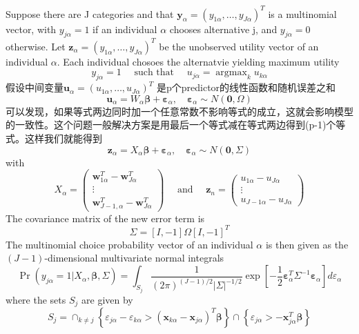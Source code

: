 \documentclass[
]{book}
\theoremstyle{definition}
\theoremstyle{definition}
\theoremstyle{definition}
\theoremstyle{remark}
\begin{document}
Suppose there are J categories and that \(\boldsymbol{y}_{\alpha}=\left(y_{1 \alpha}, \ldots, y_{J \alpha}\right)^{T}\) is a multinomial vector, with \(y_{j\alpha}=1\) if an individual \(\alpha\) chooses alternative j, and \(y_{j\alpha}=0\) otherwise. Let \(\boldsymbol{z}_{\alpha}=\left(y_{1 \alpha}, \ldots, y_{J \alpha}\right)^{T}\) be the unobserved utility vector of an individual \(\alpha\). Each individual chosoes the alternatvie yielding maximum utility
\[
y_{j \alpha}=1 \quad \text { such that } \quad u_{j \alpha}=\operatorname{argmax}_{k} u_{k \alpha}
\]
假设中间变量\(\boldsymbol{u}_{\alpha}=\left(u_{1 \alpha}, \dots, u_{J \alpha}\right)^{T}\) 是p个predictor的线性函数和随机误差之和
\[
\boldsymbol{u}_{\alpha}=W_{\alpha} \boldsymbol{\beta}+\boldsymbol{\varepsilon}_{\alpha}, \quad \boldsymbol{\varepsilon}_{\alpha} \sim N(\mathbf{0}, \Omega)
\]
可以发现，如果等式两边同时加一个任意常数不影响等式的成立，这就会影响模型的一致性。这个问题一般解决方案是用最后一个等式减在等式两边得到(p-1)个等式。这样我们就能得到
\[
\boldsymbol{z}_{\alpha}=X_{\alpha} \boldsymbol{\beta}+\boldsymbol{\varepsilon}_{\alpha}, \quad \boldsymbol{\varepsilon}_{\alpha} \sim N(\mathbf{0}, \Sigma)
\]
with
\[
X_{\alpha}=\left(\begin{array}{c}{\boldsymbol{w}_{1 \alpha}^{T}-\boldsymbol{w}_{J \alpha}^{T}} \\ {\vdots} \\ {\boldsymbol{w}_{J-1, \alpha}^{T}-\boldsymbol{w}_{J \alpha}^{T}}\end{array}\right) \quad \text { and } \quad \boldsymbol{z}_{n}=\left(\begin{array}{c}{u_{1 \alpha}-u_{J \alpha}} \\ {\vdots} \\ {u_{J-1 \alpha}-u_{J \alpha}}\end{array}\right)
\]
The covariance matrix of the new error term is
\[
\Sigma=[I,-1] \Omega[I,-1]^{T}
\]
The multinomial choice probability vector of an individual \(\alpha\) is then given as the \((J-1)\)-dimensional multivariate normal integrals
\[
\operatorname{Pr}\left(y_{j \alpha}=1 | X_{\alpha}, \boldsymbol{\beta}, \Sigma\right)=\int_{S_{j}} \frac{1}{(2 \pi)^{(J-1) / 2}|\Sigma|^{-1 / 2}} \exp \left[-\frac{1}{2} \boldsymbol{\varepsilon}_{\alpha}^{T} \Sigma^{-1} \boldsymbol{\varepsilon}_{\alpha}\right] d \varepsilon_{\alpha}
\]
where the sets \(S_j\) are given by
\[
S_{j}=\cap_{k \neq j}\left\{\varepsilon_{j \alpha}-\varepsilon_{k \alpha}>\left(\boldsymbol{x}_{k \alpha}-\boldsymbol{x}_{j \alpha}\right)^{T} \boldsymbol{\beta}\right\} \cap\left\{\varepsilon_{j \alpha}>-\boldsymbol{x}_{j \alpha}^{T} \boldsymbol{\beta}\right\}
\]
\end{document}

